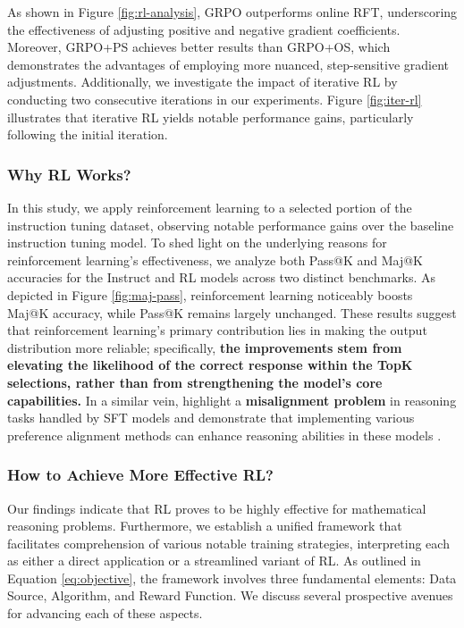 \begin{itemize}[topsep=0pt]
\begin{itemize}[topsep=0pt]
As shown in Figure \ref{fig:rl-analysis}, GRPO outperforms online RFT, underscoring the effectiveness of adjusting positive and negative gradient coefficients. Moreover, GRPO+PS achieves better results than GRPO+OS, which demonstrates the advantages of employing more nuanced, step-sensitive gradient adjustments. Additionally, we investigate the impact of iterative RL by conducting two consecutive iterations in our experiments. Figure \ref{fig:iter-rl} illustrates that iterative RL yields notable performance gains, particularly following the initial iteration.

\subsubsection{Why RL Works?} In this study, we apply reinforcement learning to a selected portion of the instruction tuning dataset, observing notable performance gains over the baseline instruction tuning model. To shed light on the underlying reasons for reinforcement learning's effectiveness, we analyze both Pass@K and Maj@K accuracies for the Instruct and RL models across two distinct benchmarks. As depicted in Figure \ref{fig:maj-pass}, reinforcement learning noticeably boosts Maj@K accuracy, while Pass@K remains largely unchanged. These results suggest that reinforcement learning's primary contribution lies in making the output distribution more reliable; specifically, \textbf{the improvements stem from elevating the likelihood of the correct response within the TopK selections, rather than from strengthening the model's core capabilities.} In a similar vein, \citep{wang2023making} highlight a \textbf{misalignment problem} in reasoning tasks handled by SFT models and demonstrate that implementing various preference alignment methods can enhance reasoning abilities in these models \citep{yuan2023rrhf,song2023preference,wang2023making}.

\subsubsection{How to Achieve More Effective RL?}
\label{sec:effec_rl}
Our findings indicate that RL proves to be highly effective for mathematical reasoning problems. Furthermore, we establish a unified framework that facilitates comprehension of various notable training strategies, interpreting each as either a direct application or a streamlined variant of RL. As outlined in Equation \ref{eq:objective}, the framework involves three fundamental elements: Data Source, Algorithm, and Reward Function. We discuss several prospective avenues for advancing each of these aspects.


\end{itemize}
\end{itemize}
